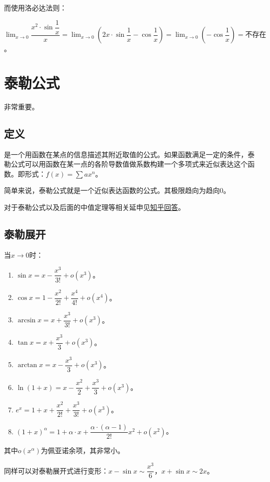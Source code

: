\documentclass[UTF8]{ctexart}
\begin{document}
而使用洛必达法则：

$\lim_{x\to 0}\dfrac{x^2\cdot\sin\dfrac{1}{x}}{x}=\lim_{x\to 0}\left(2x\cdot\sin\dfrac{1}{x}-\cos\dfrac{1}{x}\right)=\lim_{x\to 0}\left(-\cos\dfrac{1}{x}\right)=\text{不存在}$。

\section{泰勒公式}

非常重要。

\subsection{定义}

是一个用函数在某点的信息描述其附近取值的公式。如果函数满足一定的条件，泰勒公式可以用函数在某一点的各阶导数值做系数构建一个多项式来近似表达这个函数。即形式：$f(x)=\sum ax^n$。

简单来说，泰勒公式就是一个近似表达函数的公式。其极限趋向为趋向0。

对于泰勒公式以及后面的中值定理等相关延申见\href{https://www.zhihu.com/question/25627482}{知乎回答}。

\subsection{泰勒展开}

当$x\to 0$时：

\begin{enumerate}
    \item $\sin x=x-\dfrac{x^3}{3!}+o(x^3)$。
    \item $\cos x=1-\dfrac{x^2}{2!}+\dfrac{x^4}{4!}+o(x^4)$。
    \item $\arcsin x=x+\dfrac{x^3}{3!}+o(x^3)$。
    \item $\tan x=x+\dfrac{x^3}{3}+o(x^3)$。
    \item $\arctan x=x-\dfrac{x^3}{3}+o(x^3)$。
    \item $\ln(1+x)=x-\dfrac{x^2}{2}+\dfrac{x^3}{3}+o(x^3)$。
    \item $e^x=1+x+\dfrac{x^2}{2!}+\dfrac{x^3}{3!}+o(x^3)$。
    \item $(1+x)^\alpha=1+\alpha\cdot x+\dfrac{\alpha\cdot(\alpha-1)}{2!}x^2+o(x^2)$。
\end{enumerate}

其中$o(x^\alpha)$为佩亚诺余项，其非常小。

同样可以对泰勒展开式进行变形：$x-\sin x\sim\dfrac{x^3}{6}$，$x+\sin x\sim 2x$。
\end{document}
